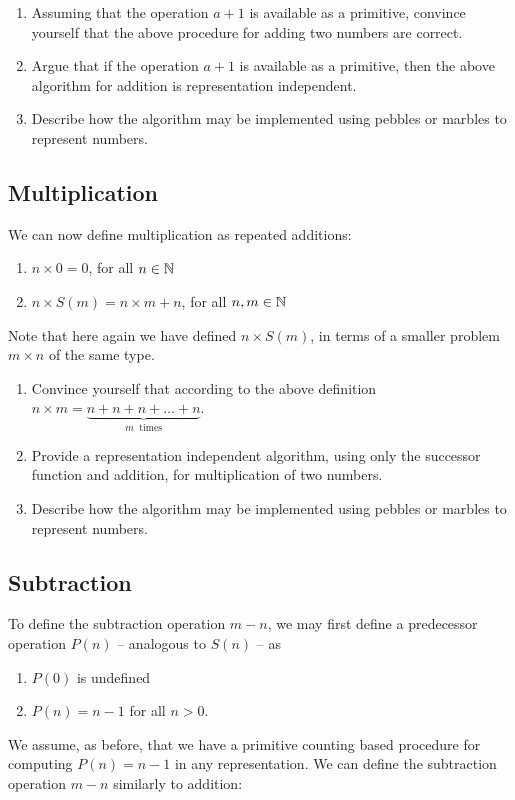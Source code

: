 \begin{exercise}
\begin{enumerate}
\item Assuming that the operation $a + 1$ is available as a primitive, convince yourself that the above procedure for adding two numbers are correct.
\item Argue that if the operation $a + 1$ is available as a primitive, then the above algorithm for addition is representation independent.
\item Describe how the algorithm may be implemented using pebbles or marbles to represent numbers.
\end{enumerate}
\end{exercise}

\subsection{Multiplication}
We can now define multiplication as repeated additions:

\begin{enumerate}
\item $n \times 0 = 0$, for all $n \in \mathbb{N}$
\item $n \times S(m) = n \times m + n$, for all $n,m \in \mathbb{N}$
\end{enumerate}
Note that here again we have defined $n \times S(m)$, in terms of a smaller problem $m \times n$ of the same type.
\begin{exercise}
\begin{enumerate}
\item Convince yourself that according to the above definition $n \times m = \underbrace{n + n + n + \ldots + n}_{m\; \; \mbox{times}}$.
\item Provide a representation independent algorithm, using only the successor function and addition, for multiplication of two numbers.
\item Describe how the algorithm may be implemented using pebbles or marbles to represent numbers.
\end{enumerate}
\end{exercise}

\subsection{Subtraction}

To define the subtraction operation $m-n$, we may first define a predecessor operation $P(n)$ -- analogous to $S(n)$  -- as
\begin{enumerate}
\item $P(0)$ is undefined
\item $P(n) = n - 1$ for all $n > 0$.
\end{enumerate}
We assume, as before, that we have a primitive counting based procedure for computing $P(n) = n - 1$ in any representation. We can define the subtraction operation $m - n$ similarly to addition:

